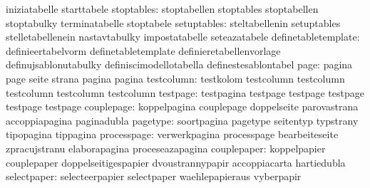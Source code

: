                                   iniziatabelle                    starttabele
                      stoptables: stoptabellen                     stoptables
                                  stoptabellen                     stoptabulky
                                  terminatabelle                   stoptabele
                     setuptables: steltabellenin                   setuptables
                                  stelletabellenein                nastavtabulky
                                  impostatabelle                   seteazatabele
             definetabletemplate: definieertabelvorm               definetabletemplate
                                  definieretabellenvorlage         definujsablonutabulky
                                  definiscimodellotabella          definestesablontabel
                            page: pagina                           page
                                  seite                            strana
                                  pagina                           pagina
                      testcolumn: testkolom                        testcolumn
                                  testcolumn                       testcolumn
                                  testcolumn                       testcolumn
                        testpage: testpagina                       testpage
                                  testpage                         testpage
                                  testpage                         testpage
                     couplepage: koppelpagina                     couplepage
                                  doppelseite                      parovastrana
                                  accoppiapagina                   paginadubla
                        pagetype: soortpagina                      pagetype
                                  seitentyp                        typstrany
                                  tipopagina                       tippagina
                     processpage: verwerkpagina                    processpage
                                  bearbeiteseite                   zpracujstranu
                                  elaborapagina                    proceseazapagina
                     couplepaper: koppelpapier                     couplepaper
                                  doppelseitigespapier             dvoustrannypapir
                                  accoppiacarta                    hartiedubla
                     selectpaper: selecteerpapier                  selectpaper
                                  waehlepapieraus                  vyberpapir
